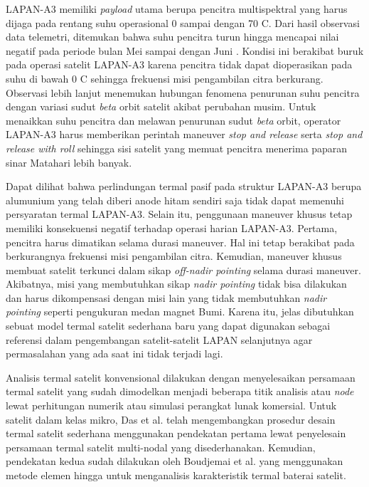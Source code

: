 LAPAN-A3 memiliki \textit{payload} utama berupa pencitra multispektral yang
harus dijaga pada rentang suhu operasional 0 sampai dengan 70 \degree C. Dari
hasil observasi data telemetri, ditemukan bahwa suhu pencitra turun hingga
mencapai nilai negatif pada periode bulan Mei sampai dengan Juni
\cite{ribah2019}. Kondisi ini berakibat buruk pada operasi satelit LAPAN-A3
karena pencitra tidak dapat dioperasikan pada suhu di bawah 0 \degree C
sehingga frekuensi misi pengambilan citra berkurang. Observasi lebih lanjut
menemukan hubungan fenomena penurunan suhu pencitra dengan variasi sudut
\textit{beta} orbit satelit akibat perubahan musim. Untuk menaikkan suhu
pencitra dan melawan penurunan sudut \textit{beta} orbit, operator LAPAN-A3
harus memberikan perintah maneuver \textit{stop and release} serta \textit{stop
and release with roll} sehingga sisi satelit yang memuat pencitra menerima
paparan sinar Matahari lebih banyak.

Dapat dilihat bahwa perlindungan termal pasif pada struktur LAPAN-A3 berupa
alumunium yang telah diberi anode hitam sendiri saja tidak dapat memenuhi
persyaratan termal LAPAN-A3. Selain itu, penggunaan maneuver khusus tetap
memiliki konsekuensi negatif terhadap operasi harian LAPAN-A3. Pertama,
pencitra harus dimatikan selama durasi maneuver. Hal ini tetap berakibat pada
berkurangnya frekuensi misi pengambilan citra. Kemudian, maneuver khusus
membuat satelit terkunci dalam sikap \textit{off-nadir pointing} selama durasi
maneuver. Akibatnya, misi yang membutuhkan sikap \textit{nadir pointing} tidak
bisa dilakukan dan harus dikompensasi dengan misi lain yang tidak membutuhkan
\textit{nadir pointing} seperti pengukuran medan magnet Bumi. Karena itu, jelas
dibutuhkan sebuat model termal satelit sederhana baru yang dapat digunakan
sebagai referensi dalam pengembangan satelit-satelit LAPAN selanjutnya agar
permasalahan yang ada saat ini tidak terjadi lagi.

Analisis termal satelit konvensional dilakukan dengan menyelesaikan persamaan
termal satelit yang sudah dimodelkan menjadi beberapa titik analisis atau \textit{node}
lewat perhitungan numerik atau simulasi perangkat lunak komersial. Untuk
satelit dalam kelas mikro, Das et al. \cite{das} telah mengembangkan prosedur
desain termal satelit sederhana menggunakan pendekatan pertama lewat
penyelesain persamaan termal satelit multi-nodal yang disederhanakan. Kemudian,
pendekatan kedua sudah dilakukan oleh Boudjemai et al. \cite{boudjemai2015}
yang menggunakan metode elemen hingga untuk menganalisis karakteristik termal
baterai satelit.

